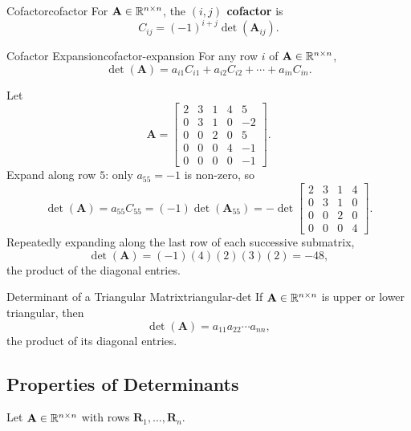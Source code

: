 \begin{definition}{Cofactor}{cofactor}
  For $\mathbf{A} \in \mathbb{R}^{n \times n}$, the \textbf{$(i,j)$ cofactor} is
  \[
    C_{ij} = (-1)^{i+j} \det(\mathbf{A}_{ij}).
  \]
\end{definition}

\begin{theorem}{Cofactor Expansion}{cofactor-expansion}
  For any row $i$ of $\mathbf{A} \in \mathbb{R}^{n \times n}$,
  \[
    \det(\mathbf{A}) = a_{i1} C_{i1} + a_{i2} C_{i2} + \cdots + a_{in} C_{in}.
  \]
\end{theorem}

\begin{example}
  Let
  \[
    \mathbf{A} =
    \begin{bmatrix}
      2 & 3 & 1 & 4 & 5  \\
      0 & 3 & 1 & 0 & -2 \\
      0 & 0 & 2 & 0 & 5  \\
      0 & 0 & 0 & 4 & -1 \\
      0 & 0 & 0 & 0 & -1
    \end{bmatrix}
    .
  \]
  Expand along row $5$: only $a_{55} = -1$ is non-zero, so
  \[
    \det(\mathbf{A}) = a_{55} C_{55} = (-1) \det(\mathbf{A}_{55})
    = -\det
    \begin{bmatrix}
      2 & 3 & 1 & 4 \\
      0 & 3 & 1 & 0 \\
      0 & 0 & 2 & 0 \\
      0 & 0 & 0 & 4
    \end{bmatrix}
    .
  \]
  Repeatedly expanding along the last row of each successive submatrix,
  \[
    \det(\mathbf{A}) = (-1)(4)(2)(3)(2) = -48,
  \]
  the product of the diagonal entries.
\end{example}

\begin{theorem}{Determinant of a Triangular Matrix}{triangular-det}
  If $\mathbf{A} \in \mathbb{R}^{n \times n}$ is upper or lower triangular, then
  \[
    \det(\mathbf{A}) = a_{11} a_{22} \cdots a_{nn},
  \]
  the product of its diagonal entries.
\end{theorem}

\subsection{Properties of Determinants}

Let $\mathbf{A} \in \mathbb{R}^{n \times n}$ with rows $\mathbf{R}_1, \dots, \mathbf{R}_n$.

